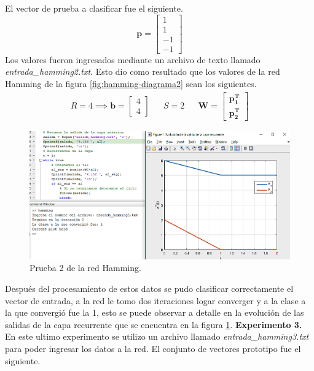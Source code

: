El vector de prueba a clasificar fue el siguiente.
\[ \boldsymbol{p} = \left[\begin{array}{c}1\\ 1\\ -1 \\ -1\end{array}\right] \]
Los valores fueron ingresados mediante un archivo de texto llamado \emph{entrada\_hamming2.txt}. Esto dio como resultado que los valores de la red Hamming de la figura \ref{fig:hamming-diagrama2} sean los siguientes.
\begin{align*}
R = 4 \implies \boldsymbol{b} = \left[\begin{array}{c}4 \\4\end{array}\right] && S = 2 && \boldsymbol{W} = \left[\begin{array}{c}\boldsymbol{p^{T}_1}\\ \boldsymbol{p^{T}_2}\end{array}\right]
\end{align*}
\begin{figure}[H]
    \begin{center}
        \includegraphics[width=16cm]{img/hamming/hamming2.png}
        \caption{Prueba 2 de la red Hamming.}
        \label{fig:hamming2}
    \end{center}
\end{figure}
Después del procesamiento de estos datos se pudo clasificar correctamente el vector de entrada, a la red le tomo dos iteraciones logar converger y a la clase a la que convergió fue la 1, esto se puede observar a detalle en la evolución de las salidas de la capa recurrente que se encuentra en la figura \ref{fig:hamming2}.
\newline
\textbf{Experimento 3.} En este ultimo experimento se utilizo un archivo llamado \emph{entrada\_hamming3.txt} para poder ingresar los datos a la red. El conjunto de vectores prototipo fue el siguiente.
